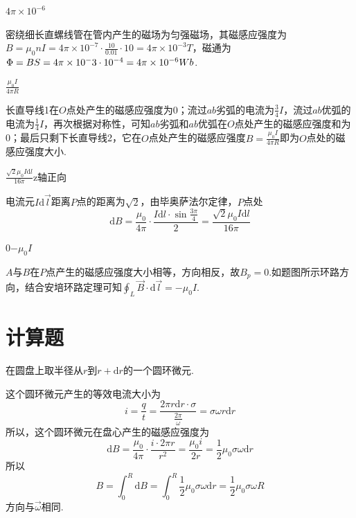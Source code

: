 \documentclass[b5paper,opensource,sourcefont,parskip]{qyxf-book}
\newcommand{\di}[1]{\mathrm{d}#1}
\begin{document}
 $4\pi\times10^{-6}$


\solve
密绕细长直螺线管在管内产生的磁场为匀强磁场，其磁感应强度为$B=\mu_0nI=4\pi\times10^{-7}\cdot\frac{10}{0.01}\cdot10=4\pi\times10^{-3}T$，磁通为$\Phi=BS=4\pi\times10^-3\cdot10\time10^{-4}=4\pi\times10^{-6}Wb$.

 $\frac{\mu_0I}{4\pi R}$

\solve
长直导线1在$O$点处产生的磁感应强度为$0$；流过$ab$劣弧的电流为$\frac{3}{4}I$，流过$ab$优弧的电流为$\frac{1}{4}I$，再次根据对称性，可知$ab$劣弧和$ab$优弧在$O$点处产生的磁感应强度和为0；最后只剩下长直导线2，它在$O$点处产生的磁感应强度$B=\frac{\mu_0I}{4\pi R}$即为$O$点处的磁感应强度大小.

 $\frac{\sqrt{2}\mu_0I\di l}{16\pi}$\quad z轴正向

\solve
电流元$I\di\vec{l}$距离$P$点的距离为$\sqrt{2}$，由毕奥萨法尔定律，$P$点处
\begin{equation*}
\di B=\frac{\mu_0}{4\pi}\cdot\frac{I\di l\cdot\sin\frac{3\pi}{4}}{2}=\frac{\sqrt{2}\mu_0I\di l}{16\pi}
\end{equation*}

 0\quad$-\mu_0 I$

\analysis
$A$与$B$在$P$点产生的磁感应强度大小相等，方向相反，故$B_p=0$.如题图所示环路方向，结合安培环路定理可知$\oint_L\vec{B}\cdot\di\vec{l}=-\mu_0 I$.

\section{计算题}

\solve
在圆盘上取半径从$r$到$r+\di r$的一个圆环微元.

这个圆环微元产生的等效电流大小为
\begin{equation*}
i=\frac{q}{t}=\frac{2\pi r\di r\cdot\sigma}{\frac{2\pi}{\omega}}=\sigma\omega r\di r
\end{equation*}
所以，这个圆环微元在盘心产生的磁感应强度为
\begin{equation*}
\di B=\frac{\mu_0}{4\pi}\cdot\frac{i\cdot2\pi r}{r^2}=\frac{\mu_0i}{2r}=\frac{1}{2}\mu_0\sigma\omega\di r
\end{equation*}
所以
\begin{equation*}
B=\int_0^R\di B=\int_0^R\frac{1}{2}\mu_0\sigma\omega\di r=\frac{1}{2}\mu_0\sigma\omega R
\end{equation*}
方向与$\vec{\omega}$相同.

\end{document}
